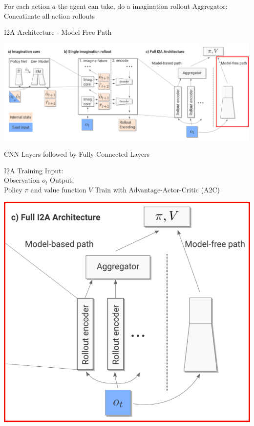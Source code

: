	     For each action $a$ the agent can take, do a imagination rollout 
		 Aggregator: \\
		Concatinate all action rollouts
	



I2A Architecture - Model Free Path


\includegraphics[width=\columnwidth]{./Images/i2a_all_model_free_path.png}%

CNN Layers followed by Fully Connected Layers



I2A Training
Input:\\
		Observation $o_t$
		 Output:\\
		Policy $\pi$ and value function $V$
		 Train with Advantage-Actor-Critic (A2C)
	
	\begin{center}
    \includegraphics[width=\columnwidth]{./Images/i2a_a2c.png}%
	\end{center}
